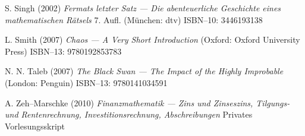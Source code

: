\begin{thebibliography}{99}
S. Singh
(2002) \emph{Fermats letzter Satz --- Die abenteuerliche
Geschichte eines mathematischen R\"atsels}
7. Aufl. (M\"unchen: dtv) ISBN--10: 3446193138

L. Smith
(2007) \emph{Chaos --- A Very Short Introduction}
(Oxford: Oxford University Press) ISBN--13: 9780192853783

N. N. Taleb
(2007) \emph{The Black Swan --- The Impact of the Highly
Improbable} (London: Penguin)
ISBN--13: 9780141034591

A. Zeh--Marschke
(2010) \emph{Finanzmathematik ---
Zins und Zinseszins, Tilgungs- und Rentenrechnung,
Investitionsrechnung, Abschreibungen}
Privates Vorlesungsskript

\end{thebibliography}

